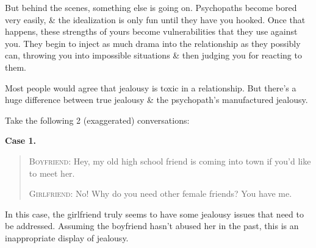\documentclass{article}
\numberwithin{equation}{section}
\begin{document}
But behind the scenes, something else is going on. Psychopaths become bored very easily, \& the idealization is only fun until they have you hooked. Once that happens, these strengths of yours become vulnerabilities that they use against you. They begin to inject as much drama into the relationship as they possibly can, throwing you into impossible situations \& then judging you for reacting to them.

Most people would agree that jealousy is toxic in a relationship. But there's a huge difference between true jealousy \& the psychopath's manufactured jealousy.

Take the following 2 (exaggerated) conversations:

\textbf{Case 1.}
\begin{quotation}
	\textsc{Boyfriend}: Hey, my old high school friend is coming into town if you'd like to meet her.
	
	\textsc{Girlfriend}: No! Why do you need other female friends? You have me.
\end{quotation}
In this case, the girlfriend truly seems to have some jealousy issues that need to be addressed. Assuming the boyfriend hasn't abused her in the past, this is an inappropriate display of jealousy.
\end{document}
